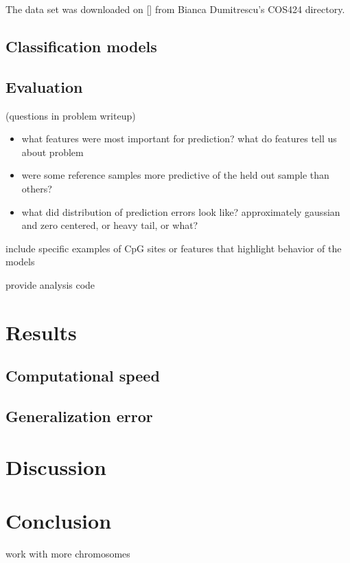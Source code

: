 \documentclass{article} %
\begin{document}
The data set was downloaded on [] from Bianca Dumitrescu's COS424 directory. 

\subsection{Classification models}

\subsection{Evaluation}

(questions in problem writeup)
\begin{itemize}
\item what features were most important for prediction? what do features tell us about problem
\item were some reference samples more predictive of the held out sample than others?
\item what did distribution of prediction errors look like? approximately gaussian and zero centered, or heavy tail, or what?
\end{itemize}

include specific examples of CpG sites or features that highlight behavior of the models

provide analysis code

\section{Results}

\subsection{Computational speed}

\subsection{Generalization error}


\section{Discussion}



\section{Conclusion}
work with more chromosomes



\end{document}
